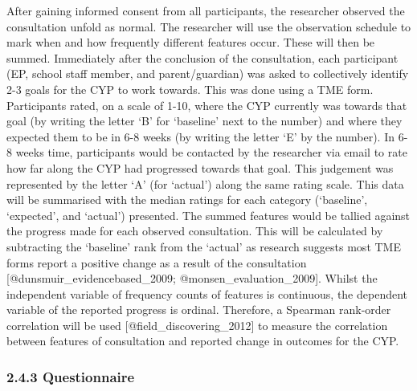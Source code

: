 \documentclass[
]{article}
\begin{document}
After gaining informed consent from all participants, the researcher
observed the consultation unfold as normal. The researcher will use the
observation schedule to mark when and how frequently different features
occur. These will then be summed. Immediately after the conclusion of
the consultation, each participant (EP, school staff member, and
parent/guardian) was asked to collectively identify 2-3 goals for the
CYP to work towards. This was done using a TME form. Participants rated,
on a scale of 1-10, where the CYP currently was towards that goal (by
writing the letter `B' for `baseline' next to the number) and where they
expected them to be in 6-8 weeks (by writing the letter `E' by the
number). In 6-8 weeks time, participants would be contacted by the
researcher via email to rate how far along the CYP had progressed
towards that goal. This judgement was represented by the letter `A' (for
`actual') along the same rating scale. This data will be summarised with
the median ratings for each category (`baseline', `expected', and
`actual') presented. The summed features would be tallied against the
progress made for each observed consultation. This will be calculated by
subtracting the `baseline' rank from the `actual' as research suggests
most TME forms report a positive change as a result of the consultation
{[}@dunsmuir\_evidencebased\_2009; @monsen\_evaluation\_2009{]}. Whilst
the independent variable of frequency counts of features is continuous,
the dependent variable of the reported progress is ordinal. Therefore, a
Spearman rank-order correlation will be used
{[}@field\_discovering\_2012{]} to measure the correlation between
features of consultation and reported change in outcomes for the CYP.

\hypertarget{questionnaire-1}{%
\subsubsection{2.4.3 Questionnaire}\label{questionnaire-1}}
\end{document}
